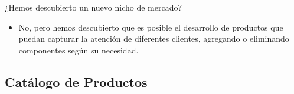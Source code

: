 \documentclass[10pt,a4paper,openany]{book}
\begin{document}
¿Hemos descubierto un nuevo nicho de mercado?
\begin{itemize}
	\item No, pero hemos descubierto que es posible el desarrollo de productos que puedan capturar la atención de diferentes clientes, agregando o eliminando componentes según su necesidad.
\end{itemize}

\subsection{Catálogo de Productos}
\end{document}
